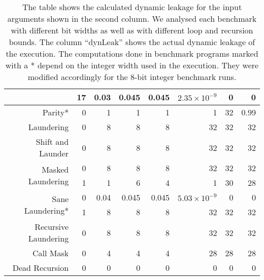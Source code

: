 \begin{table}[]
{\begin{tabular}{rr|rrr|rrr}
                                   & 17      & 0.03           & 0.045       & 0.045       & $2.35 \times 10^{-9}$                                            & 0        & 0        \\\hline\hline
Parity*                            & 0       & 1              & 1           & 1           & 1                                           & 32       & 0.99     \\\hline
Laundering                         & 0       & 8              & 8           & 8           & 32                                          & 32       & 32       \\\hline
Shift and Launder                  & 0       & 8              & 8           & 8           & 32                                          & 32       & 32       \\\hline
\multirow{2}{*}{Masked Laundering} & 0       & 8              & 8           & 8           & 32                                          & 32       & 32       \\
                                   & 1       & 1              & 6           & 4           & 1                                           & 30       & 28       \\\hline
\multirow{2}{*}{Sane Laundering*}  & 0       & 0.04           & 0.045       & 0.045       & $5.03 \times 10^{-9}$                                        & 0        & 0        \\
                                   & 1       & 8              & 8           & 8           & 32                                          & 32       & 32       \\\hline\hline
Recursive Laundering               & 0       & 8              & 8           & 8           & 32                                          & 32       & 32       \\\hline
Call Mask                          & 0       & 4              & 4           & 4           & 28                                          & 28       & 28       \\\hline
Dead Recursion                     & 0       & 0              & 0           & 0           & 0                                           & 0        & 0       
\end{tabular}
}
\caption{The table shows the calculated dynamic leakage for the input arguments shown in the second column. We analysed each benchmark with different bit widths as well as with different loop and recursion bounds. The column \enquote{dynLeak} shows the actual dynamic leakage of the execution. The computations done in benchmark programs marked with a * depend on the integer width used in the execution. They were modified accordingly for the 8-bit integer benchmark runs.}\label{tab:dLeak}
\end{table}


